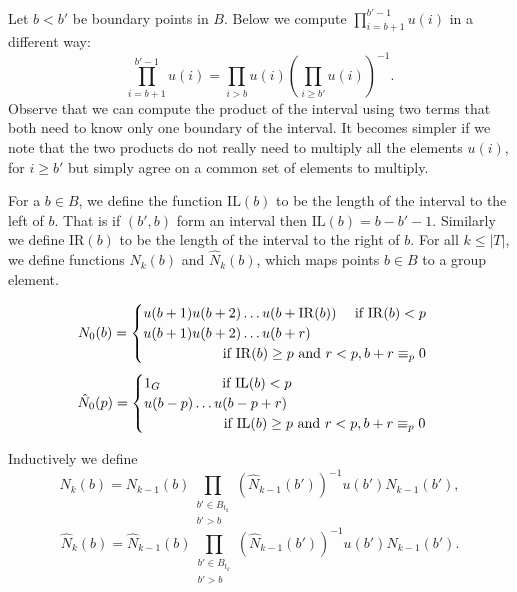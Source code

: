 \documentclass[envcountsame]{llncs}
\newcommand{\IL}{\mathrm{IL}}
\newcommand{\IR}{\mathrm{IR}}
\begin{document}
Let $b< b'$ be boundary points in $B$. Below we compute $\prod_{i=b+1}^{b'-1} u(i)$ in a different way:
$$\prod_{i=b+1}^{b'-1} u(i)=\prod_{i>b} u(i) \left( \prod_{i\geq b'} u(i)\right)^{-1}.$$
Observe that we can compute the product of the interval using two terms that both need to know only one boundary of the interval.
It becomes simpler if we note that the two products do not really need to multiply all the elements $u(i)$, for $i \geq b'$ but simply agree on a common set of elements to multiply. 


For a $b \in B$, we define the function $\IL(b)$ to be the length of the interval to the left of $b$. That is if $(b',b)$ form an interval then $\IL(b)= b- b'-1$. Similarly we define $\IR(b)$ to be the length of the interval to the right of $b$. For all $k \leq |T|$, we define functions $N_k(b)$ and $\hat N_k(b)$, which maps points $b\in B$ to a group element. 

$$N_0(b) = 
\begin{cases}
 u(b+1) u(b+2) \dots u(b+\IR(b)) \hfill  \text{if } \IR(b) < p & \\
 u(b+1) u(b+2) \dots u(b+r) & \\
 \hspace{2cm} \text{if } \IR(b)\geq p \text{ and } r < p, b+r \equiv_p 0 & \\
\end{cases}
$$
$$
\hat N_0(p)=
\begin{cases}
1_G \hspace{1.55cm} \text{if } \IL(b)< p & \\
u(b-p) \dots u(b-p+r) & \\
\hspace{2cm} \text{if } \IL(b)\geq p \text{ and } r < p, b+r \equiv_p 0 & \\
\end{cases}
$$

Inductively we define
$$N_k(b)=N_{k-1}(b)\prod_{\substack{b'\in B_{t_k}\\b'>b}} \left(\hat N_{k-1}(b')\right)^{-1} u(b') N_{k-1}(b'),$$
$$\hat N_k(b)=\hat N_{k-1}(b)\prod_{\substack{b'\in B_{t_k}\\b'>b}} \left(\hat N_{k-1}(b')\right)^{-1} u(b') N_{k-1}(b').$$
\end{document}
